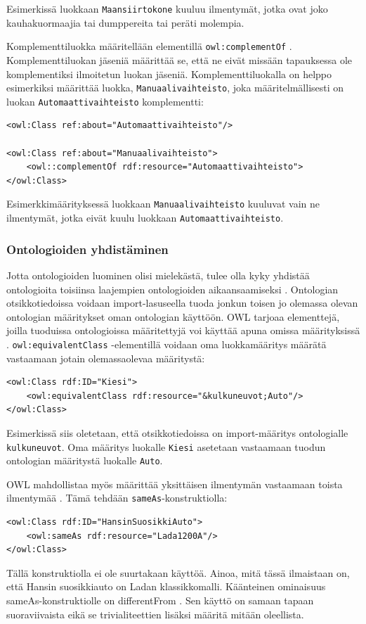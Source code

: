 \documentclass[finnish]{tktltiki2}
\theoremstyle{definition}
\theoremstyle{remark}
\begin{document}
Esimerkissä luokkaan \texttt{Maansiirtokone} kuuluu ilmentymät, jotka ovat joko kauhakuormaajia tai dumppereita tai peräti molempia.
 
Komplementtiluokka määritellään elementillä \texttt{owl:complementOf}  \cite{SWM04}. Komplementtiluokan jäseniä määrittää se, että ne eivät missään tapauksessa ole komplementiksi ilmoitetun luokan jäseniä. Komplementtiluokalla on helppo esimerkiksi määrittää luokka, \texttt{Manuaalivaihteisto}, joka määritelmällisesti on luokan \texttt{Automaattivaihteisto} komplementti:
\begin{verbatim}
<owl:Class ref:about="Automaattivaihteisto"/>

<owl:Class ref:about="Manuaalivaihteisto">
    <owl::complementOf rdf:resource="Automaattivaihteisto">
</owl:Class>
\end{verbatim}
Esimerkkimäärityksessä luokkaan \texttt{Manuaalivaihteisto} kuuluvat vain ne ilmentymät, jotka eivät kuulu luokkaan \texttt{Automaattivaihteisto}. 

\subsubsection{Ontologioiden yhdistäminen}
Jotta ontologioiden luominen olisi mielekästä, tulee olla kyky yhdistää ontologioita toisiinsa laajempien ontologioiden aikaansaamiseksi \cite{SWM04}.  Ontologian otsikkotiedoissa voidaan import-lasuseella tuoda jonkun toisen jo olemassa olevan ontologian määritykset oman ontologian käyttöön. OWL tarjoaa elementtejä, joilla tuoduissa ontologioissa määritettyjä voi käyttää apuna omissa määrityksissä \cite{SWM04}.
\texttt{owl:equivalentClass} -elementillä voidaan oma luokkamääritys määrätä vastaamaan jotain olemassaolevaa määritystä: 
\begin{verbatim}
<owl:Class rdf:ID="Kiesi">
    <owl:equivalentClass rdf:resource="&kulkuneuvot;Auto"/>
</owl:Class>
\end{verbatim}
Esimerkissä siis oletetaan, että otsikkotiedoissa on import-määritys ontologialle \texttt{kulkuneuvot}. Oma määritys luokalle \texttt{Kiesi} asetetaan vastaamaan tuodun ontologian määritystä luokalle \texttt{Auto}. 

OWL mahdollistaa myös määrittää yksittäisen ilmentymän vastaamaan toista ilmentymää \cite{SWM04}. Tämä tehdään \texttt{sameAs}-konstruktiolla: 
\begin{verbatim}
<owl:Class rdf:ID="HansinSuosikkiAuto">
    <owl:sameAs rdf:resource="Lada1200A"/>
</owl:Class>
\end{verbatim}
Tällä konstruktiolla ei ole suurtakaan käyttöä. Ainoa, mitä tässä ilmaistaan on, että Hansin suosikkiauto on Ladan klassikkomalli. Käänteinen ominaisuus sameAs-konstruktiolle on differentFrom \cite{SWM04}. Sen käyttö on samaan tapaan suoraviivaista eikä se trivialiteettien lisäksi määritä mitään oleellista. 
\end{document}
